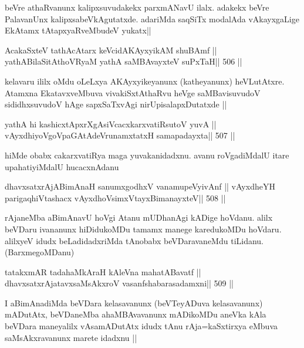 \begin{artha}
beVre athaRvanunx kalipxsuvudakekx parxmANavU ilalx. adakekx beVre
PalavanUnx kalipxsabeVkAgutatxde. adariMda saqSiTx modalAda
vAkayxgaLige EkAtamx tAtapxyaRveMbudeV yukatx||
\end{artha}



\begin{shl}
AcakaSxteV tathAcAtarx keVcidAKAyxyikAM shuBAmf ||
yathABilaSitAthoVR\s yaM yathA saMBAvayxteV suPxTaH\hfill || 506 ||
\end{shl}

\begin{artha}
kelavaru ililx oMdu oLeLxya AKAyxyikeyanunx (katheyanunx)
heVLutAtxre. Atamxna EkatavxveMbuva vivakiSxtAthaRvu heVge
saMBavisuvudoV sididhxsuvudoV hAge sapxSaTxvAgi nirUpisalapxDutatxde ||
\end{artha}

\begin{shl}
yathA hi kashicxtApxrXgAsiVcacxkarxvatiRsutoV yuvA ||
vAyxdhiyoVgoVpaGAtAdeVrunamxtatxH samapadayxta\hfill || 507 ||
\end{shl}

\begin{artha}
hiMde obabx cakarxvatiRya maga yuvakanidadxnu. avanu roVgadiMdalU
itare upahatiyiMdalU hucacxnAdanu
\end{artha}

\begin{shl}
dhavxsatxrAjABimAnaH sanumxgodhxV vanamupeVyivAnf ||
vAyxdheYH parigaqhiVtashacx vAyxdhoV\s simxVtayxBimanayxteV\hfill || 508 ||
\end{shl}

\begin{artha}
rAjaneMba aBimAnavU hoVgi Atanu mUDhanAgi kADige hoVdanu. alilx
beVDaru ivananunx hiDidukoMDu tamamx manege karedukoMDu hoVdaru.
alilxyeV idudx beLadidadxriMda tAnobabx beVDaravaneMdu tiLidanu. (BarxmegoMDanu)
\end{artha}

\begin{shl}
tatakxmAR tadahaMkAraH kAleVna mahatA\s Bavatf ||
dhavxsatxrAjatavxsaMsAkxroV vasanfshabarasadamxni\hfill || 509 ||
\end{shl}

\begin{artha}
I aBimAnadiMda beVDara kelasavanunx (beVTeyADuva kelasavanunx)
mADutAtx, beVDaneMba ahaMBAvavanunx mADikoMDu aneVka kAla beVDara
maneyalilx vAsamADutAtx idudx tAnu rAja=kaSxtirxya eMbuva
saMsAkxravanunx marete idadxnu ||
\end{artha}

